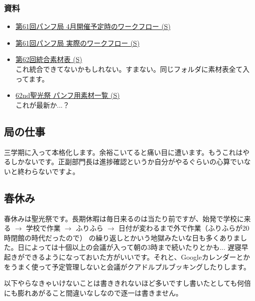 \documentclass[dvipdfmx,jb5]{jreport}
\begin{document}
\subsubsection{資料}
\begin{itemize}
      \item \href{https://docs.google.com/spreadsheets/d/1CQqoQk9K2541dx-WhdyMl7i6m3l4NQxOgOrnMKgY9Eg/edit?usp=sharing}{第61回パンフ局 4月開催予定時のワークフロー (S)}
      \item \href{https://docs.google.com/spreadsheets/d/1_B39iTxYG4pPTYhmjbtjTS1wA9dnm_Zg4s-35IgFcXM/edit?usp=sharing}{第61回パンフ局 実際のワークフロー (S)}
      \item \href{https://docs.google.com/spreadsheets/d/1NF84N6ftFbk_4xFw5B_V4LpxlGhZCpm0oSgIBLLYLrs/edit?usp=sharing}{第62回統合素材表 (S)}
            \\ これ統合できてないかもしれない。すまない。同じフォルダに素材表全て入ってます。
      \item \href{https://docs.google.com/spreadsheets/d/1-toba1DrCHhMQ5el9HqFxUu-kmNuYwbTGwxs1x6KUWQ/edit?usp=sharing}{62nd聖光祭 パンフ用素材一覧 (S)}
            \\ これが最新か...？
\end{itemize}

\subsection{局の仕事}
三学期に入って本格化します。余裕こいてると痛い目に遭います。もうこれはやるしかないです。正副部門長は進捗確認というか自分がやるぐらいの心算でいないと終わらないですよ。

\subsection{春休み}
春休みは聖光祭です。長期休暇は毎日来るのは当たり前ですが、始発で学校に来る $\longrightarrow$ 学校で作業 $\longrightarrow$ ふりふら $\longrightarrow$ 日付が変わるまで外で作業（ふりふらが20時閉館の時代だったので） の繰り返しとかいう地獄みたいな日も多くありました。日によっては十個以上の会議が入って朝の3時まで続いたりとかも... 遅寝早起きができるようになっておいた方がいいです。それと、Googleカレンダーとかをうまく使って予定管理しないと会議がクアドルプルブッキングしたりします。

以下やらなきゃいけないことは書ききれないほど多いですし書いたとしても何倍にも膨れあがること間違いなしなので逐一は書きません。
\end{document}
